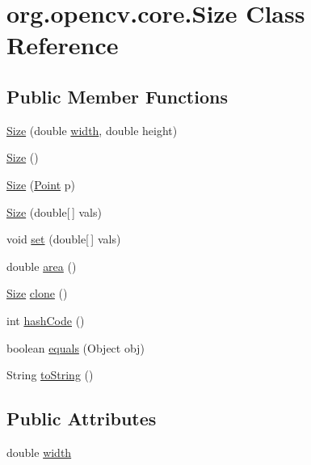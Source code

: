 \hypertarget{classorg_1_1opencv_1_1core_1_1_size}{}\section{org.\+opencv.\+core.\+Size Class Reference}
\label{classorg_1_1opencv_1_1core_1_1_size}
\subsection*{Public Member Functions}
\begin{DoxyCompactItemize}
\item 
\mbox{\hyperlink{classorg_1_1opencv_1_1core_1_1_size_aaa2bd47901a6a258743307f77615f1b7}{Size}} (double \mbox{\hyperlink{classorg_1_1opencv_1_1core_1_1_size_a7119ef5de69592ee53b253977ec86867}{width}}, double height)
\item 
\mbox{\hyperlink{classorg_1_1opencv_1_1core_1_1_size_a13601fb7ccb9fd63c532ecc92dbac417}{Size}} ()
\item 
\mbox{\hyperlink{classorg_1_1opencv_1_1core_1_1_size_a39437e6790a44e7a42d3026804f5123e}{Size}} (\mbox{\hyperlink{classorg_1_1opencv_1_1core_1_1_point}{Point}} p)
\item 
\mbox{\hyperlink{classorg_1_1opencv_1_1core_1_1_size_adf9d40704fe62c098ca5f0212f166c79}{Size}} (double\mbox{[}$\,$\mbox{]} vals)
\item 
void \mbox{\hyperlink{classorg_1_1opencv_1_1core_1_1_size_a0f76e5d50518a624e3f45bd7d4090089}{set}} (double\mbox{[}$\,$\mbox{]} vals)
\item 
double \mbox{\hyperlink{classorg_1_1opencv_1_1core_1_1_size_a7c1f2ab61f2ee4aa5b5856c313dc1d27}{area}} ()
\item 
\mbox{\hyperlink{classorg_1_1opencv_1_1core_1_1_size}{Size}} \mbox{\hyperlink{classorg_1_1opencv_1_1core_1_1_size_a9292f9172f23b7fbb1f22a04042f4a39}{clone}} ()
\item 
int \mbox{\hyperlink{classorg_1_1opencv_1_1core_1_1_size_a044377a2502bc4b1d07a0a493785e74c}{hash\+Code}} ()
\item 
boolean \mbox{\hyperlink{classorg_1_1opencv_1_1core_1_1_size_a6ad61f587c7a94872da9c8033bd317dc}{equals}} (Object obj)
\item 
String \mbox{\hyperlink{classorg_1_1opencv_1_1core_1_1_size_a6def71949e570165a90058d5c0f50254}{to\+String}} ()
\end{DoxyCompactItemize}
\subsection*{Public Attributes}
\begin{DoxyCompactItemize}
\item 
double \mbox{\hyperlink{classorg_1_1opencv_1_1core_1_1_size_a7119ef5de69592ee53b253977ec86867}{width}}
\end{DoxyCompactItemize}


